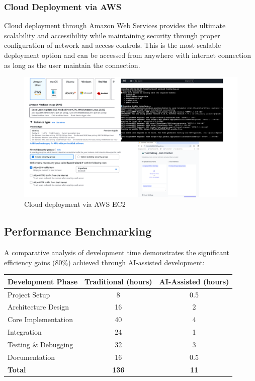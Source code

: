 \documentclass[12pt,letterpaper]{article}
\begin{document}
\subsubsection{Cloud Deployment via AWS}

Cloud deployment through Amazon Web Services provides the ultimate scalability and accessibility while maintaining security through proper configuration of network and access controls.
This is the most scalable deployment option and can be accessed from anywhere with internet connection as long as the user maintain the connection.

\begin{figure}[H]
    \centering
    \includegraphics[width=1.1\textwidth]{plots/AWS.png}
    \caption{Cloud deployment via AWS EC2}
    \label{fig:AWS}
\end{figure}

\subsection{Performance Benchmarking}

A comparative analysis of development time demonstrates the significant efficiency gains (80\%) achieved through AI-assisted development:

\begin{center}
\begin{tabular}{|l|c|c|}
\hline
\textbf{Development Phase} & \textbf{Traditional (hours)} & \textbf{AI-Assisted (hours)} \\
\hline
Project Setup & 8 & 0.5 \\
Architecture Design & 16 & 2 \\
Core Implementation & 40 & 4 \\
Integration & 24 & 1 \\
Testing \& Debugging & 32 & 3 \\
Documentation & 16 & 0.5 \\
\hline
\textbf{Total} & \textbf{136} & \textbf{11} \\
\hline
\end{tabular}
\end{center}
\end{document}
